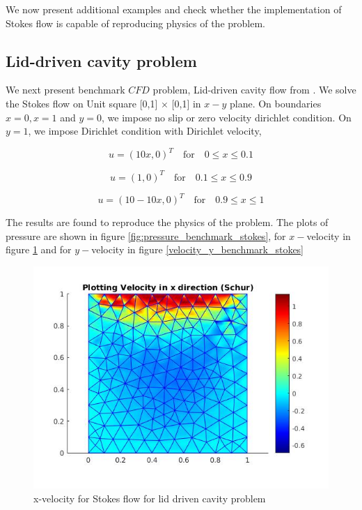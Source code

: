 \documentclass[a4paper,12pt]{book}
\begin{document}
We now present additional examples and check whether the implementation of Stokes flow is capable of reproducing physics of the problem.

\subsection{Lid-driven cavity problem}

We next present benchmark $CFD$ problem, Lid-driven cavity flow from \cite{Montlaur}. We solve the Stokes flow on Unit square [0,1] $\times$ [0,1] in $x-y$ plane. On boundaries ${x = 0}, {x = 1}$ and ${y = 0}$, we impose no slip or zero velocity dirichlet condition. On ${y = 1}$, we impose Dirichlet condition with Dirichlet velocity,

\begin{center}

\begin{equation}
u = (10x,0)^T \quad \textrm{for} \quad 0 \leq x \leq 0.1
\end{equation}

\begin{equation}
u = (1,0)^T \quad \textrm{for} \quad 0.1 \leq x \leq 0.9
\end{equation}

\begin{equation}
u = (10 - 10x,0)^T \quad \textrm{for} \quad 0.9 \leq x \leq 1
\end{equation}

\end{center}

The results are found to reproduce the physics of the problem. The plots of pressure are shown in figure \ref{fig:pressure_benchmark_stokes}, for $x-$velocity in figure \ref{fig:velocity_x_benchmark_stokes} and for $y-$velocity in figure \ref{velocity_y_benchmark_stokes}


\begin{figure}
  \includegraphics[width=\linewidth]{velocity_x_schur.jpg}
  \caption{x-velocity for Stokes flow for lid driven cavity problem}
  \label{fig:velocity_x_benchmark_stokes}
\end{figure}
\end{document}
